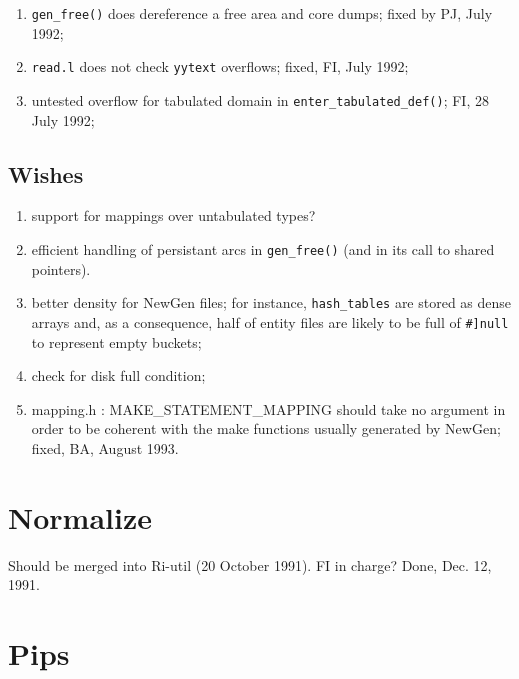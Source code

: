 \begin{enumerate}
  \item	\verb+gen_free()+ does dereference a free area and core dumps;
	fixed by PJ, July 1992;

  \item \verb+read.l+ does not check \verb+yytext+ overflows; fixed, FI,
	July 1992;

  \item untested overflow for tabulated domain in \verb+enter_tabulated_def()+;
	FI, 28 July 1992;

\end{enumerate}

\subsection{Wishes}

\begin{enumerate}

  \item support for mappings over untabulated types?

  \item efficient handling of persistant arcs in \verb+gen_free()+
	(and in its call to shared pointers).

  \item better density for NewGen files; for instance, \verb+hash_tables+ are
	stored as dense arrays and, as a consequence, half of entity files
	are likely to be full of \verb+#]null+ to represent empty buckets;

  \item check for disk full condition; 

  \item mapping.h : MAKE_STATEMENT_MAPPING should take no argument in
	order to be coherent with the make functions usually generated
	by NewGen; fixed, BA, August 1993. 

\end{enumerate}

\section{Normalize}

Should be merged into Ri-util (20 October 1991). FI in charge? Done,
Dec. 12, 1991.

\newpage

\section{Pips}


